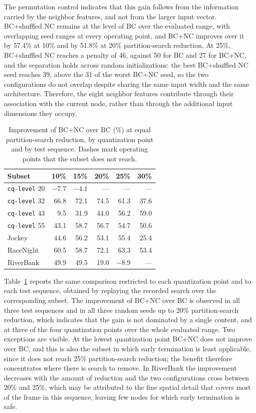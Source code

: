 \documentclass{article}
\begin{document}
The permutation control indicates that this gain follows from the information carried by the neighbor features, and not from the larger input vector. BC+shuffled NC remains at the level of BC over the evaluated range, with overlapping seed ranges at every operating point, and BC+NC improves over it by 57.4\% at 10\% and by 51.8\% at 20\% partition-search reduction. At 25\%, BC+shuffled NC reaches a penalty of 46, against 50 for BC and 27 for BC+NC, and the separation holds across random initializations: the best BC+shuffled NC seed reaches 39, above the 31 of the worst BC+NC seed, so the two configurations do not overlap despite sharing the same input width and the same architecture. Therefore, the eight neighbor features contribute through their association with the current node, rather than through the additional input dimensions they occupy.

\begin{table}[t]
\caption{Improvement of BC+NC over BC (\%) at equal partition-search reduction, by quantization point and by test sequence. Dashes mark operating points that the subset does not reach.}
\label{tab:slices}
\centering
\setlength{\tabcolsep}{3.6pt}
\begin{tabular}{lrrrrr}
\hline
\textbf{Subset} & \textbf{10\%} & \textbf{15\%} & \textbf{20\%}
& \textbf{25\%} & \textbf{30\%} \\
\hline
\texttt{cq-level} 20 & $-7.7$ & $-4.1$ & --- & --- & --- \\
\texttt{cq-level} 32 & 66.8 & 72.1 & 74.5 & 61.3 & 37.6 \\
\texttt{cq-level} 43 & 9.5 & 31.9 & 44.0 & 56.2 & 59.0 \\
\texttt{cq-level} 55 & 43.1 & 58.7 & 56.7 & 54.7 & 50.6 \\
\hline
Jockey & 44.6 & 56.2 & 53.1 & 55.4 & 25.4 \\
RaceNight & 60.5 & 58.7 & 72.1 & 63.3 & 53.4 \\
RiverBank & 49.9 & 49.5 & 19.0 & $-8.9$ & --- \\
\hline
\end{tabular}
\end{table}

Table~\ref{tab:slices} reports the same comparison restricted to each quantization point and to each test sequence, obtained by replaying the recorded search over the corresponding subset. The improvement of BC+NC over BC is observed in all three test sequences and in all three random seeds up to 20\% partition-search reduction, which indicates that the gain is not dominated by a single content, and at three of the four quantization points over the whole evaluated range. Two exceptions are visible. At the lowest quantization point BC+NC does not improve over BC, and this is also the subset in which early termination is least applicable, since it does not reach 25\% partition-search reduction; the benefit therefore concentrates where there is search to remove. In RiverBank the improvement decreases with the amount of reduction and the two configurations cross between 20\% and 25\%, which may be attributed to the fine spatial detail that covers most of the frame in this sequence, leaving few nodes for which early termination is safe.
\end{document}
